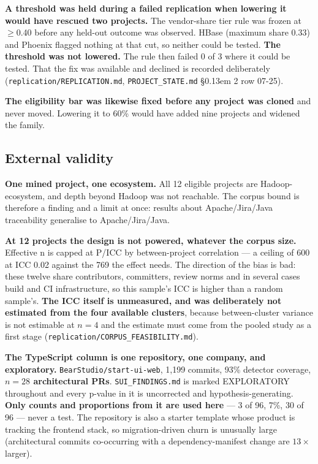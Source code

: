 \documentclass[conference]{IEEEtran}
\begin{document}
\textbf{A threshold was held during a failed replication when lowering it would have rescued two projects.} The vendor-share tier rule was frozen at $\geq$0.40 before any held-out outcome was observed. HBase (maximum share 0.33) and Phoenix flagged nothing at that cut, so neither could be tested. \textbf{The threshold was not lowered.} The rule then failed 0 of 3 where it could be tested. That the fix was available and declined is recorded deliberately (\texttt{replication/\allowbreak{}REPLICATION.\allowbreak{}md}, \texttt{PROJECT\_\allowbreak{}STATE.\allowbreak{}md} \S\kern0.13em 2 row 07-25).

\textbf{The eligibility bar was likewise fixed before any project was cloned} and never moved. Lowering it to 60\% would have added nine projects and widened the family.

\subsection{External validity}
\label{sec:6.7}

\textbf{One mined project, one ecosystem.} All 12 eligible projects are Hadoop-ecosystem, and depth beyond Hadoop was not reachable. The corpus bound is therefore a finding and a limit at once: results about Apache/Jira/Java traceability generalise to Apache/Jira/Java.

\textbf{At 12 projects the design is not powered, whatever the corpus size.} Effective n is capped at P/ICC by between-project correlation --- a ceiling of 600 at ICC 0.02 against the 769 the effect needs. The direction of the bias is bad: these twelve share contributors, committers, review norms and in several cases build and CI infrastructure, so this sample's ICC is higher than a random sample's. \textbf{The ICC itself is unmeasured, and was deliberately not estimated from the four available clusters}, because between-cluster variance is not estimable at $n=4$ and the estimate must come from the pooled study as a first stage (\texttt{replication/\allowbreak{}CORPUS\_\allowbreak{}FEASIBILITY.\allowbreak{}md}).

\textbf{The TypeScript column is one repository, one company, and exploratory.} \texttt{BearStudio/\allowbreak{}start-\allowbreak{}ui-\allowbreak{}web}, 1,199 commits, 93\% detector coverage, \textbf{$n=28$ architectural PRs}. \texttt{SUI\_\allowbreak{}FINDINGS.\allowbreak{}md} is marked EXPLORATORY throughout and every p-value in it is uncorrected and hypothesis-generating. \textbf{Only counts and proportions from it are used here} --- 3 of 96, 7\%, 30 of 96 --- never a test. The repository is also a starter template whose product is tracking the frontend stack, so migration-driven churn is unusually large (architectural commits co-occurring with a dependency-manifest change are $13\times$ larger).
\end{document}
